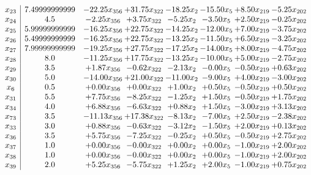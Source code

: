 \documentclass[8pt]{article}
\begin{document}
\[\begin{array}{c| c c@{\hskip 2pt} c@{\hskip 2pt} c@{\hskip 2pt} c@{\hskip 2pt} c@{\hskip 2pt} c@{\hskip 2pt} }
 x_{23}   &  7.49999999999 & -22.25 x_{356} & + 31.75 x_{322} & -18.25 x_{2} & -15.50 x_{5} & +  8.50 x_{219} & -5.25 x_{202}\\
 x_{24}   &  4.5 & -2.25 x_{356} & +  3.75 x_{322} & -5.25 x_{2} & -3.50 x_{5} & +  2.50 x_{219} & -0.25 x_{202}\\
 x_{25}   &  5.99999999999 & -16.25 x_{356} & + 22.75 x_{322} & -14.25 x_{2} & -12.00 x_{5} & +  7.00 x_{219} & -3.75 x_{202}\\
 x_{26}   &  5.49999999999 & -16.25 x_{356} & + 22.75 x_{322} & -13.25 x_{2} & -11.50 x_{5} & +  6.50 x_{219} & -3.25 x_{202}\\
 x_{27}   &  7.99999999999 & -19.25 x_{356} & + 27.75 x_{322} & -17.25 x_{2} & -14.00 x_{5} & +  8.00 x_{219} & -4.75 x_{202}\\
 x_{28}   &  8.0 & -11.25 x_{356} & + 17.75 x_{322} & -13.25 x_{2} & -10.00 x_{5} & +  5.00 x_{219} & -2.75 x_{202}\\
 x_{29}   &  3.5 & +  1.87 x_{356} & -0.62 x_{322} & -2.13 x_{2} & -0.00 x_{5} & -0.50 x_{219} & +  0.63 x_{202}\\
 x_{30}   &  5.0 & -14.00 x_{356} & + 21.00 x_{322} & -11.00 x_{2} & -9.00 x_{5} & +  4.00 x_{219} & -3.00 x_{202}\\
 x_{6}   &  0.5 & +  0.00 x_{356} & +  0.00 x_{322} & +  1.00 x_{2} & +  0.50 x_{5} & -0.50 x_{219} & +  0.50 x_{202}\\
 x_{31}   &  5.5 & +  7.75 x_{356} & -8.25 x_{322} & -1.25 x_{2} & +  1.50 x_{5} & -0.50 x_{219} & +  1.75 x_{202}\\
 x_{34}   &  4.0 & +  6.88 x_{356} & -6.63 x_{322} & +  0.88 x_{2} & +  1.50 x_{5} & -3.00 x_{219} & +  3.13 x_{202}\\
 x_{73}   &  3.5 & -11.13 x_{356} & + 17.38 x_{322} & -8.13 x_{2} & -7.00 x_{5} & +  2.50 x_{219} & -2.38 x_{202}\\
 x_{33}   &  3.0 & +  0.88 x_{356} & -0.63 x_{322} & -3.12 x_{2} & -1.50 x_{5} & +  2.00 x_{219} & +  0.13 x_{202}\\
 x_{36}   &  3.5 & +  5.75 x_{356} & -7.25 x_{322} & -0.25 x_{2} & +  0.50 x_{5} & -0.50 x_{219} & +  2.75 x_{202}\\
 x_{37}   &  1.0 & +  0.00 x_{356} & -0.00 x_{322} & +  0.00 x_{2} & +  0.00 x_{5} & -1.00 x_{219} & +  2.00 x_{202}\\
 x_{38}   &  1.0 & +  0.00 x_{356} & -0.00 x_{322} & +  0.00 x_{2} & +  0.00 x_{5} & -1.00 x_{219} & +  2.00 x_{202}\\
 x_{39}   &  2.0 & +  5.25 x_{356} & -5.75 x_{322} & +  1.25 x_{2} & +  2.00 x_{5} & -1.00 x_{219} & +  0.75 x_{202}\\

\end{array}\]
\end{document}
